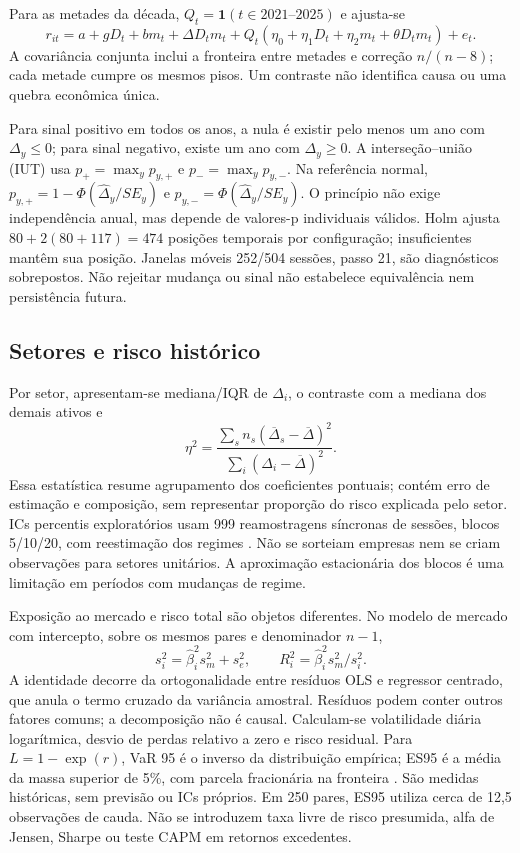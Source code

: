 Para as metades da década, $Q_t=\mathbf{1}(t\in2021\text{--}2025)$
e ajusta-se
\begin{equation}
r_{it}=a+gD_t+bm_t+\Delta D_tm_t+
 Q_t(\eta_0+\eta_1 D_t+\eta_2 m_t+\theta D_tm_t)+e_t.
\end{equation}
A covariância conjunta inclui a fronteira entre metades e correção
$n/(n-8)$; cada metade cumpre os mesmos pisos. Um contraste
não identifica causa ou uma quebra econômica única.

Para sinal positivo em todos os anos, a nula é existir pelo menos um
ano com $\Delta_y\le0$; para sinal negativo, existe um ano
com $\Delta_y\ge0$. A interseção--união (IUT)
\cite{bergerhsu1996} usa $p_+=\max_y p_{y,+}$ e
$p_-=\max_y p_{y,-}$. Na referência normal,
$p_{y,+}=1-\Phi(\widehat\Delta_y/SE_y)$ e
$p_{y,-}=\Phi(\widehat\Delta_y/SE_y)$. O princípio não exige
independência anual, mas depende de valores-p individuais válidos.
Holm ajusta $80+2(80+117)=474$ posições temporais por configuração;
insuficientes mantêm sua posição. Janelas móveis 252/504 sessões,
passo 21, são diagnósticos sobrepostos. Não rejeitar mudança ou sinal
não estabelece equivalência nem persistência futura.

\subsection{Setores e risco histórico}
Por setor, apresentam-se mediana/IQR de $\Delta_i $, o contraste com
a mediana dos demais ativos e
\begin{equation}
\eta^2=\frac{\sum_s n_s(\overline\Delta_s-\overline\Delta)^2}
 {\sum_i(\Delta_i-\overline\Delta)^2}.
\end{equation}
Essa estatística resume agrupamento dos coeficientes pontuais;
contém erro de estimação e composição, sem representar proporção
do risco explicada pelo setor. ICs percentis exploratórios usam 999
reamostragens síncronas de sessões, blocos 5/10/20, com reestimação
dos regimes \cite{kunsch1989}. Não se sorteiam empresas nem se
criam observações para setores unitários. A aproximação estacionária
dos blocos é uma limitação em períodos com mudanças de regime.

Exposição ao mercado e risco total são objetos diferentes. No modelo de mercado com
intercepto, sobre os mesmos pares e denominador $n-1$,
\begin{equation}
s_i^2=\widehat\beta_i^2 s_m^2+s_e^2,\qquad
R_i^2=\widehat\beta_i^2 s_m^2/s_i^2.
\end{equation}
A identidade decorre da ortogonalidade entre resíduos OLS e regressor
centrado, que anula o termo cruzado da variância amostral.
Resíduos podem conter outros fatores comuns; a decomposição não
é causal. Calculam-se volatilidade diária logarítmica, desvio de perdas
relativo a zero e risco residual. Para $L=1-\exp(r)$, VaR 95 é o
inverso da distribuição empírica; ES95 é a média da massa superior
de 5\%, com parcela fracionária na fronteira \cite{rockafellar1999}.
São medidas históricas, sem previsão ou ICs próprios. Em 250 pares,
ES95 utiliza cerca de 12,5 observações de cauda. Não se introduzem
taxa livre de risco presumida, alfa de Jensen, Sharpe ou teste CAPM
em retornos excedentes.


